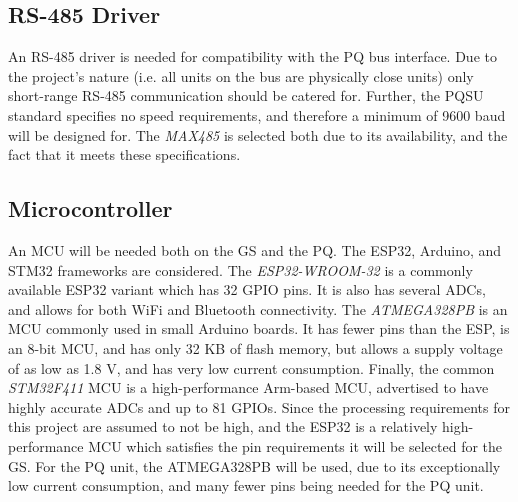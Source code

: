 \subsection{RS-485 Driver}
An RS-485 driver is needed for compatibility with the PQ bus interface. Due to the project's nature (i.e. all units on the bus are physically close units) only short-range RS-485 communication should be catered for. Further, the PQSU standard specifies no speed requirements, and therefore a minimum of 9600 baud will be designed for. The \textit{MAX485} is selected both due to its availability, and the fact that it meets these specifications.

\subsection{Microcontroller}
An MCU will be needed both on the GS and the PQ. The ESP32, Arduino, and STM32 frameworks are considered. The \textit{ESP32-WROOM-32} is a commonly available ESP32 variant which has 32 GPIO pins. It is also has several ADCs, and allows for both WiFi and Bluetooth connectivity. The \textit{ATMEGA328PB} is an MCU commonly used in small Arduino boards. It has fewer pins than the ESP, is an 8-bit MCU, and has only 32 KB of flash memory, but allows a supply voltage of as low as 1.8 V, and has very low current consumption. Finally, the common \textit{STM32F411} MCU is a high-performance Arm-based MCU, advertised to have highly accurate ADCs and up to 81 GPIOs. Since the processing requirements for this project are assumed to not be high, and the ESP32 is a relatively high-performance MCU which satisfies the pin requirements it will be selected for the GS. For the PQ unit, the ATMEGA328PB will be used, due to its exceptionally low current consumption, and many fewer pins being needed for the PQ unit.

